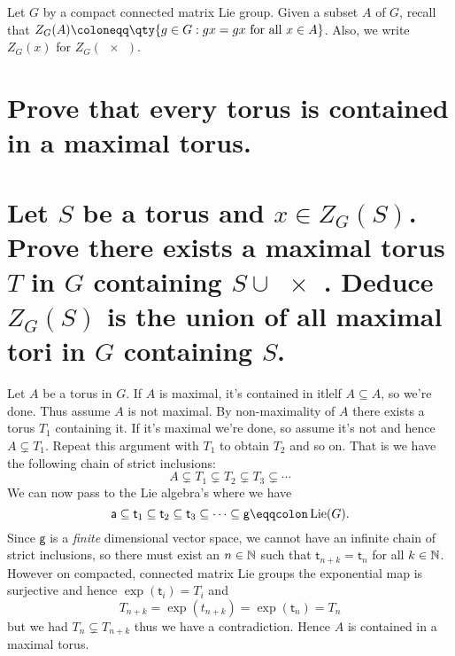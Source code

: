 \documentclass[
	pages,
	boxes,
	color=WildStrawberry
]{homework}
\begin{document}
\begin{problem}
Let $G$ by a compact connected matrix Lie group. Given a subset $A$ of $G$, recall that $Z_G(A)\defeq\qty{g\in G : gx = gx \text{ for all } x\in A}$. Also, we write $Z_G(x)$ for $Z_G(\qty{x})$.
\begin{parts}
	\part{Prove that every torus is contained in a maximal torus.}\label{part:1a}
	\part{Let $S$ be a torus and $x\in Z_G(S)$. Prove there exists a maximal torus $T$ in $G$ containing $S\cup \qty{x}$. Deduce $Z_G(S)$ is the union of all maximal tori in $G$ containing $S$.}\label{part:1b}
\end{parts}
\end{problem}

\begin{solution}
	\ref{part:1a}
	Let $A$ be a torus in $G$. If $A$ is maximal, it's contained in itlelf $A\subseteq A$, so we're done. Thus assume $A$ is not maximal. By non-maximality of $A$ there exists a torus $T_1$ containing it. If it's maximal we're done, so assume it's not and hence $A\subsetneq T_1$. Repeat this argument with $T_1$ to obtain $T_2$ and so on. That is we have the following chain of strict inclusions:
	\begin{equation*}
		A\subsetneq T_1 \subsetneq T_2 \subsetneq T_3 \subsetneq \cdots
	\end{equation*}
	We can now pass to the Lie algebra's where we have
	\begin{equation*}
		\mathsf{a} \subseteq \mathsf{t}_1 \subseteq \mathsf{t}_2 \subseteq \mathsf{t}_3 \subseteq \cdots \subseteq \mathsf{g} \eqdef \Lie(G).
	\end{equation*}
	Since $\mathsf{g}$ is a \emph{finite} dimensional vector space, we cannot have an infinite chain of strict inclusions, so there must exist an $n\in \mathbb{N}$ such that $\mathsf{t}_{n + k} = \mathsf{t}_n$ for all $k\in \mathbb{N}$. However on compacted, connected matrix Lie groups the exponential map is surjective and hence $\exp(\mathsf{t}_i) = T_i$ and
	\begin{equation*}
		T_{n + k} = \exp(t_{n + k}) = \exp(\mathsf{t}_n) = T_n
	\end{equation*}
	but we had $T_{n} \subsetneq T_{n + k}$ thus we have a contradiction. Hence $A$ is contained in a maximal torus.

	\ref{part:1b}

\end{solution}
\end{document}
